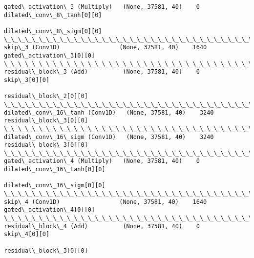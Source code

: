 \documentclass[11pt]{article}
\begin{document}
\begin{Verbatim}[commandchars=\\\{\}]
gated\_activation\_3 (Multiply)   (None, 37581, 40)    0           dilated\_conv\_8\_tanh[0][0]        
                                                                 dilated\_conv\_8\_sigm[0][0]        
\_\_\_\_\_\_\_\_\_\_\_\_\_\_\_\_\_\_\_\_\_\_\_\_\_\_\_\_\_\_\_\_\_\_\_\_\_\_\_\_\_\_\_\_\_\_\_\_\_\_\_\_\_\_\_\_\_\_\_\_\_\_\_\_\_\_\_\_\_\_\_\_\_\_\_\_\_\_\_\_\_\_\_\_\_\_\_\_\_\_\_\_\_\_\_\_\_\_
skip\_3 (Conv1D)                 (None, 37581, 40)    1640        gated\_activation\_3[0][0]         
\_\_\_\_\_\_\_\_\_\_\_\_\_\_\_\_\_\_\_\_\_\_\_\_\_\_\_\_\_\_\_\_\_\_\_\_\_\_\_\_\_\_\_\_\_\_\_\_\_\_\_\_\_\_\_\_\_\_\_\_\_\_\_\_\_\_\_\_\_\_\_\_\_\_\_\_\_\_\_\_\_\_\_\_\_\_\_\_\_\_\_\_\_\_\_\_\_\_
residual\_block\_3 (Add)          (None, 37581, 40)    0           skip\_3[0][0]                     
                                                                 residual\_block\_2[0][0]           
\_\_\_\_\_\_\_\_\_\_\_\_\_\_\_\_\_\_\_\_\_\_\_\_\_\_\_\_\_\_\_\_\_\_\_\_\_\_\_\_\_\_\_\_\_\_\_\_\_\_\_\_\_\_\_\_\_\_\_\_\_\_\_\_\_\_\_\_\_\_\_\_\_\_\_\_\_\_\_\_\_\_\_\_\_\_\_\_\_\_\_\_\_\_\_\_\_\_
dilated\_conv\_16\_tanh (Conv1D)   (None, 37581, 40)    3240        residual\_block\_3[0][0]           
\_\_\_\_\_\_\_\_\_\_\_\_\_\_\_\_\_\_\_\_\_\_\_\_\_\_\_\_\_\_\_\_\_\_\_\_\_\_\_\_\_\_\_\_\_\_\_\_\_\_\_\_\_\_\_\_\_\_\_\_\_\_\_\_\_\_\_\_\_\_\_\_\_\_\_\_\_\_\_\_\_\_\_\_\_\_\_\_\_\_\_\_\_\_\_\_\_\_
dilated\_conv\_16\_sigm (Conv1D)   (None, 37581, 40)    3240        residual\_block\_3[0][0]           
\_\_\_\_\_\_\_\_\_\_\_\_\_\_\_\_\_\_\_\_\_\_\_\_\_\_\_\_\_\_\_\_\_\_\_\_\_\_\_\_\_\_\_\_\_\_\_\_\_\_\_\_\_\_\_\_\_\_\_\_\_\_\_\_\_\_\_\_\_\_\_\_\_\_\_\_\_\_\_\_\_\_\_\_\_\_\_\_\_\_\_\_\_\_\_\_\_\_
gated\_activation\_4 (Multiply)   (None, 37581, 40)    0           dilated\_conv\_16\_tanh[0][0]       
                                                                 dilated\_conv\_16\_sigm[0][0]       
\_\_\_\_\_\_\_\_\_\_\_\_\_\_\_\_\_\_\_\_\_\_\_\_\_\_\_\_\_\_\_\_\_\_\_\_\_\_\_\_\_\_\_\_\_\_\_\_\_\_\_\_\_\_\_\_\_\_\_\_\_\_\_\_\_\_\_\_\_\_\_\_\_\_\_\_\_\_\_\_\_\_\_\_\_\_\_\_\_\_\_\_\_\_\_\_\_\_
skip\_4 (Conv1D)                 (None, 37581, 40)    1640        gated\_activation\_4[0][0]         
\_\_\_\_\_\_\_\_\_\_\_\_\_\_\_\_\_\_\_\_\_\_\_\_\_\_\_\_\_\_\_\_\_\_\_\_\_\_\_\_\_\_\_\_\_\_\_\_\_\_\_\_\_\_\_\_\_\_\_\_\_\_\_\_\_\_\_\_\_\_\_\_\_\_\_\_\_\_\_\_\_\_\_\_\_\_\_\_\_\_\_\_\_\_\_\_\_\_
residual\_block\_4 (Add)          (None, 37581, 40)    0           skip\_4[0][0]                     
                                                                 residual\_block\_3[0][0]           

\end{Verbatim}
\end{document}

